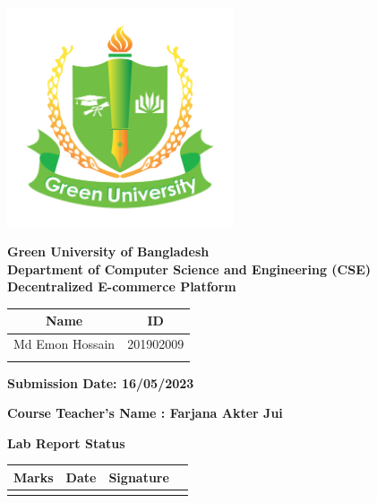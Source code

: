 \documentclass[a4paper,11pt]{article}
\begin{document}
\begin{center}


\includegraphics[width=0.5\textwidth]{Green_University_of_Bangladesh_logo.svg.png} 


\textbf{\normalsize{ Green University of Bangladesh}} \\
\textbf{\normalsize{Department of Computer Science and Engineering (CSE)}}\\[1cm]

\textbf{\LARGE{Decentralized E-commerce Platform}}\\[1cm]

\begin{table}[H]
    \centering
    \begin{tabular}{|c|c|} \hline
       \textbf{Name} &  \textbf{ID} \\ \hline
       Md Emon Hossain  & 201902009 \\ \hline
        & \\ \hline
       
    \end{tabular}
   
\end{table} 

\vspace{0.5cm}


 
\textbf{\large Submission Date: 16/05/2023}
\vspace{1cm}

\textbf{\large Course Teacher's Name : Farjana Akter Jui}

\begin{center}
\textbf{Lab Report Status}
\end{center}

\begin{table}[h]
\centering
\begin{tabular}{|p{4cm}|p{6cm}|p{4cm}|} \hline
\textbf{Marks} & \textbf{Date}& \textbf{Signature} \\ \hline  
                &              &                     
                   &              &                     \\ \hline



\end{tabular}
\end{table}
\end{center}
\end{document}

